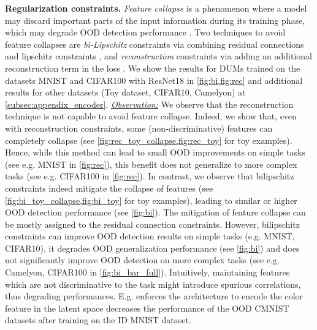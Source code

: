 \textbf{Regularization constraints.} \emph{Feature collapse} is a phenomenon where a model may discard important parts of the input information during its training phase, which may degrade OOD detection performance \citep{due}. Two techniques to avoid feature collapses are \textit{bi-Lipschitz} constraints via combining residual connections and lipschitz constraints \citep{uncertainty-distance-awareness}, and \textit{reconstruction} constraints via adding an additional reconstruction term in the loss \citep{postels2020mir}. We show the results for DUMs trained on the datasets MNIST and CIFAR100 with ResNet18 in \cref{fig:bi,fig:rec} and additional results for other datasets (Toy dataset, CIFAR10, Camelyon) at \cref{subsec:appendix_encoder}. \underline{\textit{Observation:}} We observe that the reconstruction technique is not capable to avoid feature collapse. Indeed, we show  that, even with reconstruction constraints, some (non-discriminative) features can completely collapse (see \cref{fig:rec_toy_collapse,fig:rec_toy} for toy examples). Hence, while this method can lead to small OOD improvements on simple tasks (see e.g. MNIST in \cref{fig:rec}), this benefit does not generalize to more complex tasks (see e.g. CIFAR100 in \cref{fig:rec}). In contrast, we observe that bilipschitz constraints indeed mitigate the collapse of features (see \cref{fig:bi_toy_collapse,fig:bi_toy} for toy examples), leading to similar or higher OOD detection performance (see \cref{fig:bi}). The mitigation of feature collapse can be mostly assigned to the residual connection constraints. However, bilipschitz constraints can improve OOD detection results on simple tasks (e.g. MNIST, CIFAR10), it degrades OOD generalization performance (see \cref{fig:bi}) and does not significantly improve OOD detection on more complex tasks (see e.g. Camelyon, CIFAR100 in \cref{fig:bi_bar_full}). Intuitively, maintaining features which are not discriminative to the task might introduce spurious correlations, thus degrading performances. E.g. enforces the architecture to encode the color feature in the latent space decreases the performance of the OOD CMNIST datasets after training on the ID MNIST dataset. 

